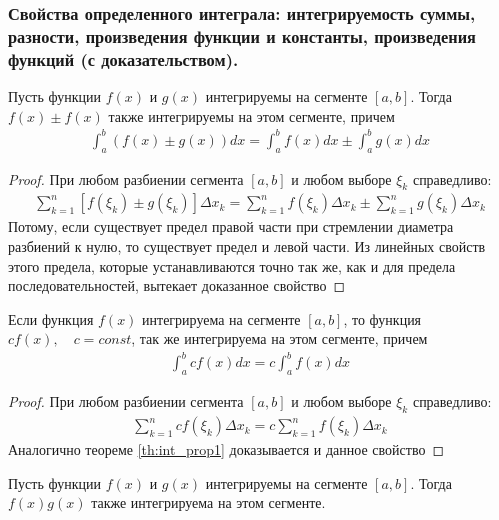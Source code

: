 \documentclass[10pt]{article}
\begin{document}
    \subsubsection{Свойства определенного интеграла: интегрируемость суммы, разности, произведения функции и константы, произведения функций (с доказательством).}
    \begin{theorem}
        Пусть функции $f(x)$ и $g(x)$ интегрируемы на сегменте $[a, b]$. Тогда $f(x) \pm f(x)$ также интегрируемы на этом сегменте, причем
        \begin{gather*}
            \int_a^b (f(x) \pm g(x)) dx = \int_a^b f(x) dx \pm \int_a^b g(x) dx
        \end{gather*}
        \label{th:int_prop1}
    \end{theorem}
    \begin{proof}
        При любом разбиении сегмента $[a, b]$ и любом выборе $\xi_k$ справедливо:
        \begin{gather*}
            \sum_{k=1}^n [f(\xi_k) \pm g(\xi_k)] \Delta x_k = \sum_{k = 1}^n f(\xi_k) \Delta x_k \pm \sum_{k=1}^n g(\xi_k) \Delta x_k
        \end{gather*}
        Потому, если существует предел правой части при стремлении диаметра разбиений к нулю, то существует предел и левой части. Из линейных свойств этого предела, которые устанавливаются точно так же, как и для предела последовательностей, вытекает доказанное свойство
    \end{proof}
    \begin{theorem}
        Если функция $f(x)$ интегрируема на сегменте $[a, b]$, то функция $cf(x),\quad c=const$, так же интегрируема на этом сегменте, причем
        \begin{gather*}
            \int_a^b cf(x)dx = c \int_a^b f(x) dx
        \end{gather*}
        \label{th:int_prop2}
    \end{theorem}
    \begin{proof}
        При любом разбиении сегмента $[a, b]$ и любом выборе $\xi_k$ справедливо:
        \begin{gather*}
            \sum_{k=1}^n cf(\xi_k) \Delta x_k = c \sum_{k=1}^n f(\xi_k) \Delta x_k
        \end{gather*}
        Аналогично теореме \ref{th:int_prop1} доказывается и данное свойство 
    \end{proof}
    \begin{theorem}
        Пусть функции $f(x)$ и $g(x)$ интегрируемы на сегменте $[a, b]$. Тогда $f(x)g(x)$ также интегрируема на этом сегменте.
        \label{th:int_prop3}
    \end{theorem}
\end{document}
